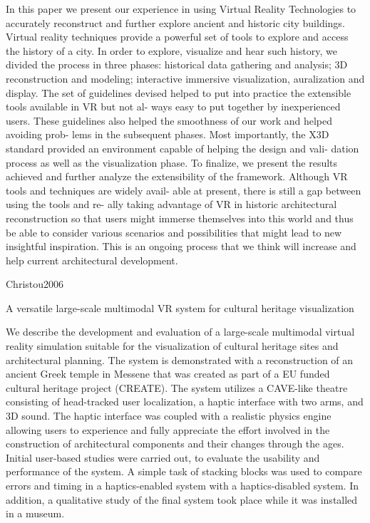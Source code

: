 In this paper we present our experience in using Virtual Reality
Technologies to accurately reconstruct and further explore ancient
and historic city buildings. Virtual reality techniques provide a
powerful set of tools to explore and access the history of a city.
In order to explore, visualize and hear such history, we divided the
process in three phases: historical data gathering and analysis; 3D
reconstruction and modeling; interactive immersive visualization,
auralization and display. The set of guidelines devised helped to
put into practice the extensible tools available in VR but not al-
ways easy to put together by inexperienced users. These guidelines
also helped the smoothness of our work and helped avoiding prob-
lems in the subsequent phases. Most importantly, the X3D standard
provided an environment capable of helping the design and vali-
dation process as well as the visualization phase. To finalize, we
present the results achieved and further analyze the extensibility of
the framework. Although VR tools and techniques are widely avail-
able at present, there is still a gap between using the tools and re-
ally taking advantage of VR in historic architectural reconstruction
so that users might immerse themselves into this world and thus be
able to consider various scenarios and possibilities that might lead
to new insightful inspiration. This is an ongoing process that we
think will increase and help current architectural development.


Christou2006

A versatile large-scale multimodal VR system for cultural heritage visualization

We describe the development and evaluation of a large-scale
multimodal virtual reality simulation suitable for the visualization
of cultural heritage sites and architectural planning. The system is
demonstrated with a reconstruction of an ancient Greek temple in
Messene that was created as part of a EU funded cultural heritage
project (CREATE). The system utilizes a CAVE-like theatre
consisting of head-tracked user localization, a haptic interface
with two arms, and 3D sound. The haptic interface was coupled
with a realistic physics engine allowing users to experience and
fully appreciate the effort involved in the construction of
architectural components and their changes through the ages.
Initial user-based studies were carried out, to evaluate the
usability and performance of the system. A simple task of
stacking blocks was used to compare errors and timing in a
haptics-enabled system with a haptics-disabled system. In
addition, a qualitative study of the final system took place while
it was installed in a museum.

